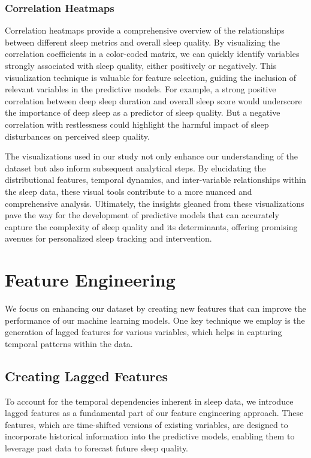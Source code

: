 \documentclass[10pt]{extarticle}
\begin{document}
\subsubsection{Correlation Heatmaps}

Correlation heatmaps provide a comprehensive overview of the relationships between different sleep metrics and overall sleep quality. By visualizing the correlation coefficients in a color-coded matrix, we can quickly identify variables strongly associated with sleep quality, either positively or negatively. This visualization technique is valuable for feature selection, guiding the inclusion of relevant variables in the predictive models. For example, a strong positive correlation between deep sleep duration and overall sleep score would underscore the importance of deep sleep as a predictor of sleep quality. But a negative correlation with restlessness could highlight the harmful impact of sleep disturbances on perceived sleep quality.

The visualizations used in our study not only enhance our understanding of the dataset but also inform subsequent analytical steps. By elucidating the distributional features, temporal dynamics, and inter-variable relationships within the sleep data, these visual tools contribute to a more nuanced and comprehensive analysis. Ultimately, the insights gleaned from these visualizations pave the way for the development of predictive models that can accurately capture the complexity of sleep quality and its determinants, offering promising avenues for personalized sleep tracking and intervention.

\section{Feature Engineering}

We focus on enhancing our dataset by creating new features that can improve the performance of our machine learning models. One key technique we employ is the generation of lagged features for various variables, which helps in capturing temporal patterns within the data.

\subsection{Creating Lagged Features}

To account for the temporal dependencies inherent in sleep data, we introduce lagged features as a fundamental part of our feature engineering approach. These features, which are time-shifted versions of existing variables, are designed to incorporate historical information into the predictive models, enabling them to leverage past data to forecast future sleep quality.
\end{document}
